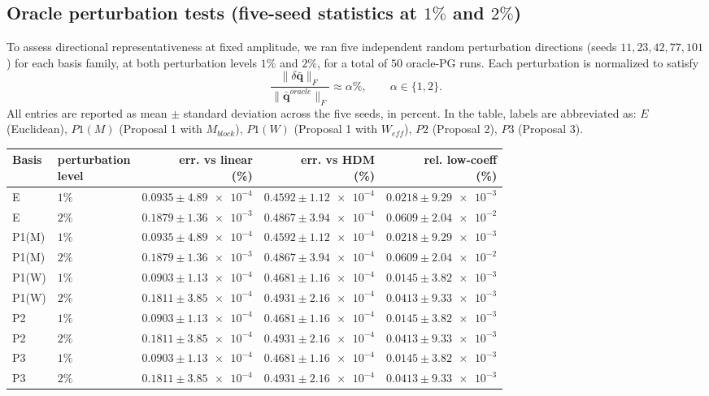\documentclass[11pt]{article}
\begin{document}
\subsection*{Oracle perturbation tests (five-seed statistics at \(1\%\) and \(2\%\))}
To assess directional representativeness at fixed amplitude, we ran five independent random perturbation directions (seeds \(11,23,42,77,101\)) for each basis family, at both perturbation levels \(1\%\) and \(2\%\), for a total of \(50\) oracle-PG runs.
Each perturbation is normalized to satisfy
\[
\frac{\|\delta\bar{\mathbf q}\|_F}{\|\bar{\mathbf q}^{oracle}\|_F}\approx \alpha\%,
\qquad \alpha\in\{1,2\}.
\]
All entries are reported as mean \(\pm\) standard deviation across the five seeds, in percent.
In the table, labels are abbreviated as:
\(E\) (Euclidean), \(P1(M)\) (Proposal 1 with \(M_{block}\)),
\(P1(W)\) (Proposal 1 with \(W_{eff}\)), \(P2\) (Proposal 2), \(P3\) (Proposal 3).

\begingroup
\setlength{\tabcolsep}{2.5pt}
\small
{}
\begin{longtable}{llrrr}
\toprule
Basis &
\makecell[c]{perturbation\\level} &
\makecell[c]{err. vs linear\\(\%)} &
\makecell[c]{err. vs HDM\\(\%)} &
\makecell[c]{rel. low-coeff\\(\%)} \\
\midrule
E & \(1\%\) & \(\num{0.0935}\pm\num{4.89e-4}\) & \(\num{0.4592}\pm\num{1.12e-4}\) & \(\num{0.0218}\pm\num{9.29e-3}\) \\
E & \(2\%\) & \(\num{0.1879}\pm\num{1.36e-3}\) & \(\num{0.4867}\pm\num{3.94e-4}\) & \(\num{0.0609}\pm\num{2.04e-2}\) \\
\midrule
P1(M) & \(1\%\) & \(\num{0.0935}\pm\num{4.89e-4}\) & \(\num{0.4592}\pm\num{1.12e-4}\) & \(\num{0.0218}\pm\num{9.29e-3}\) \\
P1(M) & \(2\%\) & \(\num{0.1879}\pm\num{1.36e-3}\) & \(\num{0.4867}\pm\num{3.94e-4}\) & \(\num{0.0609}\pm\num{2.04e-2}\) \\
\midrule
P1(W) & \(1\%\) & \(\num{0.0903}\pm\num{1.13e-4}\) & \(\num{0.4681}\pm\num{1.16e-4}\) & \(\num{0.0145}\pm\num{3.82e-3}\) \\
P1(W) & \(2\%\) & \(\num{0.1811}\pm\num{3.85e-4}\) & \(\num{0.4931}\pm\num{2.16e-4}\) & \(\num{0.0413}\pm\num{9.33e-3}\) \\
\midrule
P2 & \(1\%\) & \(\num{0.0903}\pm\num{1.13e-4}\) & \(\num{0.4681}\pm\num{1.16e-4}\) & \(\num{0.0145}\pm\num{3.82e-3}\) \\
P2 & \(2\%\) & \(\num{0.1811}\pm\num{3.85e-4}\) & \(\num{0.4931}\pm\num{2.16e-4}\) & \(\num{0.0413}\pm\num{9.33e-3}\) \\
\midrule
P3 & \(1\%\) & \(\num{0.0903}\pm\num{1.13e-4}\) & \(\num{0.4681}\pm\num{1.16e-4}\) & \(\num{0.0145}\pm\num{3.82e-3}\) \\
P3 & \(2\%\) & \(\num{0.1811}\pm\num{3.85e-4}\) & \(\num{0.4931}\pm\num{2.16e-4}\) & \(\num{0.0413}\pm\num{9.33e-3}\) \\
\bottomrule
\end{longtable}
\endgroup
\end{document}
